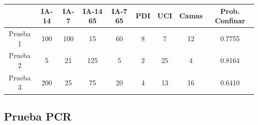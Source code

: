 \documentclass[12pt,a4paper, xcolor=table]{article}
\begin{document}
    \vspace{2mm}

    \begin{center}
      \hspace{-13mm}
    \begin{tabular}{c|c|c|c|c|c|c|c|c|}
      \cline{2-9}
                                    & IA-14 & IA-7 & IA-14 65 & IA-7 65 & PDI & UCI & Camas & \textbf{Prob. Confinar} \\ \hline
    \multicolumn{1}{|c|}{Prueba 1} & 100 & 100 & 15 & 60 & 8 & 7 & 12 & 0.7755 \\ \hline
    \multicolumn{1}{|c|}{Prueba 2} & 5 & 21 & 125 & 5 & 2 & 25 & 4 & 0.8164 \\ \hline
    \multicolumn{1}{|c|}{Prueba 3} & 200 & 25 & 75 & 20 & 4 & 13 & 16 & 0.6410 \\ \hline
    \end{tabular}
    \end{center}

  \subsection{Prueba PCR}
    
\end{document}
